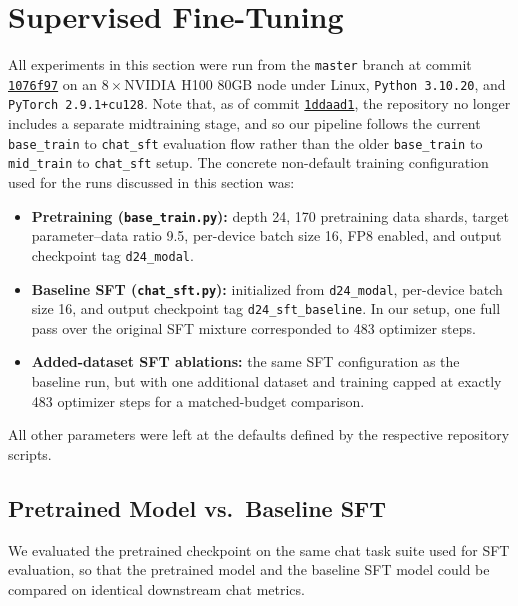 \documentclass[a4paper,12pt]{article}
\begin{document}
\newpage


\section{Supervised Fine-Tuning}
\label{section2}

All experiments in this section were run from the \texttt{master} branch at commit \href{https://github.com/karpathy/nanochat/commit/1076f97059785ed6d763706bf2304ce7721ab75c}{\texttt{1076f97}} on an 8\,$\times$\,NVIDIA H100 80GB node under Linux, \texttt{Python 3.10.20}, and \texttt{PyTorch 2.9.1+cu128}. Note that, as of commit \href{https://github.com/karpathy/nanochat/commit/1ddaad1c1c37f3553a59f556bc757c4aea585bef}{\texttt{1ddaad1}}, the repository no longer includes a separate midtraining stage, and so our pipeline follows the current \texttt{base\_train} to \texttt{chat\_sft} evaluation flow rather than the older \texttt{base\_train} to \texttt{mid\_train} to \texttt{chat\_sft} setup. The concrete non-default training configuration used for the runs discussed in this section was:
\begin{itemize}
    \item \textbf{Pretraining (\texttt{base\_train.py}):} depth 24, 170 pretraining data shards, target parameter--data ratio 9.5, per-device batch size 16, FP8 enabled, and output checkpoint tag \texttt{d24\_modal}.
    \item \textbf{Baseline SFT (\texttt{chat\_sft.py}):} initialized from \texttt{d24\_modal}, per-device batch size 16, and output checkpoint tag \texttt{d24\_sft\_baseline}. In our setup, one full pass over the original SFT mixture corresponded to 483 optimizer steps.
    \item \textbf{Added-dataset SFT ablations:} the same SFT configuration as the baseline run, but with one additional dataset and training capped at exactly 483 optimizer steps for a matched-budget comparison.
\end{itemize}
All other parameters were left at the defaults defined by the respective repository scripts.

\subsection{Pretrained Model vs.\ Baseline SFT}
\label{section2-1}

We evaluated the pretrained checkpoint on the same chat task suite used for SFT evaluation, so that the pretrained model and the baseline SFT model could be compared on identical downstream chat metrics.\\
\end{document}
